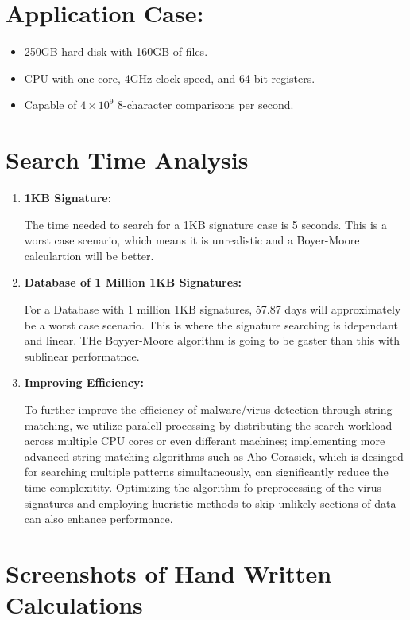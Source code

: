 \documentclass{article}
\begin{document}
\section*{Application Case:}
\begin{itemize}
    \item 250GB hard disk with 160GB of files.
    \item CPU with one core, 4GHz clock speed, and 64-bit registers.
    \item Capable of \(4 \times 10^9\) 8-character comparisons per second.
\end{itemize}

\section*{Search Time Analysis}

\begin{enumerate}
    \item \textbf{ 1KB Signature:}
    
    The time needed to search for a 1KB signature case is 5 seconds. This is a worst case scenario, which means it is unrealistic and a Boyer-Moore calculartion will be better. 
    
    \item \textbf{Database of 1 Million 1KB Signatures:}
    
    For a Database with 1 million 1KB signatures, 57.87 days will approximately be a worst case scenario. This is where the signature searching is idependant and linear. THe Boyyer-Moore algorithm is going to be gaster than this with sublinear performatnce. 
    
    \item \textbf{Improving Efficiency:}
    
    To further improve the efficiency of malware/virus detection through string matching, we utilize paralell processing by distributing the search workload across multiple CPU cores or even differant machines; implementing more advanced string matching algorithms such as Aho-Corasick, which is desinged for searching multiple patterns simultaneously, can significantly reduce the time complexitity. Optimizing the algorithm fo preprocessing of the virus signatures and employing hueristic methods to skip unlikely sections of data can also enhance performance.  
    
\end{enumerate}
\section*{Screenshots of Hand Written Calculations}
\end{document}
